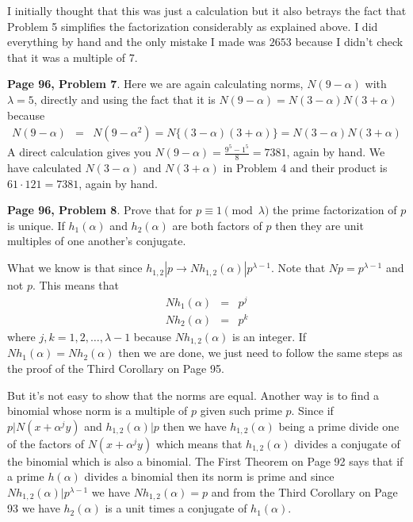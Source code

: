 \documentclass[aps,preprint,preprintnumbers,nofootinbib,showpacs,prd]{revtex4-1}
\newcommand{\nbea}{\begin{eqnarray*}}
\newcommand{\neea}{\end{eqnarray*}}
\begin{document}
I initially thought that this was just a calculation but it also betrays the fact that Problem 5 simplifies the factorization considerably as explained above. I did everything by hand and the only mistake I made was $2653$ because I didn't check that it was a multiple of 7.

{\bf Page 96, Problem 7}. Here we are again calculating norms, $N(9 - \alpha)$ with $\lambda = 5$, directly and using the fact that it is $N(9-\alpha) = N(3 - \alpha)N(3 + \alpha)$ because
%
\nbea
N(9 - \alpha) & = & N(9 - \alpha^2) = N \{(3 - \alpha) (3 + \alpha) \} = N(3 - \alpha) N(3 + \alpha)
\neea
%
A direct calculation gives you $N(9 - \alpha) = \frac{9^5 - 1^5}{8} = 7381$, again by hand. We have calculated $N(3 - \alpha)$ and $N(3 + \alpha)$ in Problem 4 and their product is $61 \cdot 121 = 7381$, again by hand.

{\bf Page 96, Problem 8}. Prove that for $p \equiv 1 \pmod{\lambda}$ the prime factorization of $p$ is unique. If $h_1(\alpha)$ and $h_2(\alpha)$ are both factors of $p$ then they are unit multiples of one another's conjugate.

What we know is that since $h_{1,2}|p \to Nh_{1,2}(\alpha) | p^{\lambda - 1}$. Note that $N p = p^{\lambda - 1}$ and not $p$. This means that 
%
\nbea
Nh_1(\alpha) & = & p^j \\
Nh_2(\alpha) & = & p^k
\neea
%
where $j,k = 1,2,\dots,\lambda - 1$ because $Nh_{1,2}(\alpha)$ is an integer. If $Nh_1(\alpha) = Nh_2(\alpha)$ then we are done, we just need to follow the same steps as the proof of the Third Corollary on Page 95.

But it's not easy to show that the norms are equal. Another way is to find a binomial whose norm is a multiple of $p$ given such prime $p$. Since if $p|N(x + \alpha^j y)$ and $h_{1,2}(\alpha)|p$ then we have $h_{1,2}(\alpha)$ being a prime divide one of the factors of $N(x + \alpha^j y)$ which means that $h_{1,2}(\alpha)$ divides a conjugate of the binomial which is also a binomial. The First Theorem on Page 92 says that if a prime $h(\alpha)$ divides a binomial then its norm is prime and since $Nh_{1,2}(\alpha) | p^{\lambda - 1}$ we have $Nh_{1,2}(\alpha) = p$ and from the Third Corollary on Page 93 we have $h_2(\alpha)$ is a unit times a conjugate of $h_1(\alpha)$.
\end{document}
